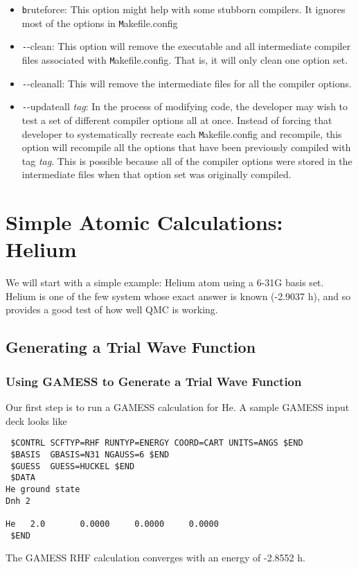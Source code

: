 \documentclass[11pt]{article}
\begin{document}
\begin{itemize}
\item {\texttt bruteforce}: This option might help with some stubborn compilers. It ignores most of the options in {\texttt Makefile.config}
\item {\texttt --clean}: This option will remove the executable and all intermediate compiler files associated with {\texttt Makefile.config}. That is, it will only clean one option set.
\item {\texttt --cleanall}: This will remove the intermediate files for all the compiler options.
\item {\texttt --updateall \textit{tag}}: In the process of modifying code, the developer may wish to test a set of different compiler options all at once. Instead of forcing that developer to systematically recreate each {\texttt Makefile.config} and recompile, this option will recompile all the options that have been previously compiled with tag \textit{tag}. This is possible because all of the compiler options were stored in the intermediate files when that option set was originally compiled.
\end{itemize}


\section{Simple Atomic Calculations: Helium}
We will start with a simple example: Helium atom using a 6-31G basis
set. Helium is one of the few system whose exact answer is known
(-2.9037 h), and so provides a good test of how well QMC is working.
\subsection{Generating a Trial Wave Function}
\subsubsection{Using GAMESS to Generate a Trial Wave Function}
Our first step is to run a GAMESS calculation for He. A sample GAMESS
input deck looks like
\begin{verbatim}
 $CONTRL SCFTYP=RHF RUNTYP=ENERGY COORD=CART UNITS=ANGS $END
 $BASIS  GBASIS=N31 NGAUSS=6 $END
 $GUESS  GUESS=HUCKEL $END
 $DATA
He ground state
Dnh 2

He   2.0       0.0000     0.0000     0.0000 
 $END
\end{verbatim}
The GAMESS RHF calculation converges with an energy of -2.8552 h.
\end{document}
